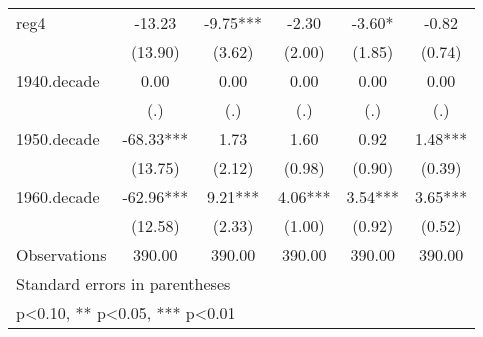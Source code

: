 {\begin{tabular}{l*{5}{c}}
\addlinespace
reg4            &     -13.23   &      -9.75***&      -2.30   &      -3.60*  &      -0.82   \\
                &    (13.90)   &     (3.62)   &     (2.00)   &     (1.85)   &     (0.74)   \\
\addlinespace
1940.decade     &       0.00   &       0.00   &       0.00   &       0.00   &       0.00   \\
                &        (.)   &        (.)   &        (.)   &        (.)   &        (.)   \\
\addlinespace
1950.decade     &     -68.33***&       1.73   &       1.60   &       0.92   &       1.48***\\
                &    (13.75)   &     (2.12)   &     (0.98)   &     (0.90)   &     (0.39)   \\
\addlinespace
1960.decade     &     -62.96***&       9.21***&       4.06***&       3.54***&       3.65***\\
                &    (12.58)   &     (2.33)   &     (1.00)   &     (0.92)   &     (0.52)   \\
\midrule
Observations    &     390.00   &     390.00   &     390.00   &     390.00   &     390.00   \\
\bottomrule
\multicolumn{6}{l}{\footnotesize Standard errors in parentheses}\\
\multicolumn{6}{l}{\footnotesize * p<0.10, ** p<0.05, *** p<0.01}\\
\end{tabular}
}
